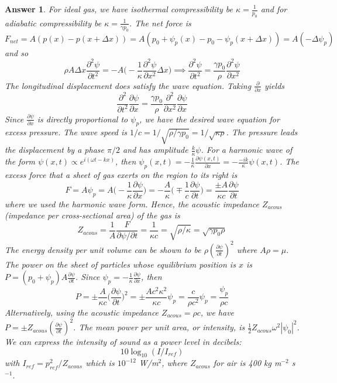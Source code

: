 \documentclass[a4paper]{article}
\newtheorem{ans}{Answer}[subsection]
\theoremstyle{new}
\begin{document}
\begin{ans}
For ideal gas, we have isothermal compressibility be $\kappa=\frac{1}{p_0}$ and for adiabatic compressibility be $\kappa=\frac{1}{\gamma p_0}$. The net force is $F_{net}=A(p(x)-p(x+\Delta x))=A(p_0+\psi_p(x)-p_0-\psi_p(x+\Delta x))=A(-\Delta\psi_p)$ and so
$$\rho A\Delta x\frac{\partial^2\psi}{\partial t^2}=-A\bigg(-\frac{1}{\kappa}\frac{\partial^2\psi}{\partial x^2}\Delta x\bigg)\implies\frac{\partial^2\psi}{\partial t^2}=\frac{\gamma p_0}{\rho}\frac{\partial^2\psi}{\partial x^2}$$
The longitudinal displacement does satisfy the wave equation. Taking $\frac{\partial}{\partial x}$ yields $$\frac{\partial^2}{\partial t^2}\frac{\partial\psi}{\partial x}=\frac{\gamma p_0}{\rho}\frac{\partial^2}{\partial x^2}\frac{\partial\psi}{\partial x}$$
Since $\frac{\partial\psi}{\partial x}$ is directly proportional to $\psi_p$, we have the desired wave equation for excess pressure. The wave speed is $1/c=1/\sqrt{\rho/\gamma p_0}=1/\sqrt{\kappa\rho}$. The pressure leads the displacement by a phase $\pi/2$ and has amplitude $\frac{k}{\kappa}\psi$. For a harmonic wave of the form $\psi(x,t)\propto e^{i(\omega t-kx)}$, then $\psi_p(x,t)=-\frac{1}{\kappa}\frac{\partial\psi(x,t)}{\partial x}=-\frac{-ik}{\kappa}\psi(x,t)$. The excess force that a sheet of gas exerts on the region to its right is $$F=A\psi_p=A\bigg(-\frac{1}{\kappa}\frac{\partial\psi}{\partial x}\bigg)=-\frac{A}{\kappa}\bigg(\mp\frac{1}{c}\frac{\partial\psi}{\partial t}\bigg)=\frac{\pm A}{\kappa c}\frac{\partial\psi}{\partial t}$$
where we used the harmonic wave form. Hence, the acoustic impedance  $Z_{acous}$ (impedance per cross-sectional area) of the gas is $$Z_{acous}=\frac{1}{A}\frac{F}{\partial\psi/\partial t}=\frac{1}{\kappa c}=\sqrt{\rho/\kappa}=\sqrt{\gamma p_0\rho}$$
The energy density per unit volume can be shown to be $\rho(\frac{\partial\psi}{\partial t})^2$ where $A\rho=\mu$. The power on the sheet of particles whose equilibrium position is $x$ is $P=(p_0+\psi_p)A\frac{\partial\psi}{\partial t}$. Since $\psi_p=-\frac{1}{\kappa}\frac{\partial\psi}{\partial x}$, then $$P=\pm\frac{A}{\kappa c}\bigg(\frac{\partial\psi}{\partial t}\bigg)^2=\pm\frac{Ac^2\kappa^2}{\kappa c}\psi_p=\frac{c}{\rho c^2}\psi_p=\frac{\psi_p}{\rho c}$$ 
Alternatively, using the acoustic impedance $Z_{acous}=\rho c$, we have $P=\pm Z_{acous}(\frac{\partial\psi}{\partial t})^2$. The mean power per unit area, or intensity, is  $\frac{1}{2}Z_{acous}\omega^2|\psi_0|^2$. We can express the intensity of sound as a power level in decibels:
$$10\log_{10}(I/I_{ref})$$
with $I_{ref}=p_{ref}^2/Z_{acous}$ which is $10^{-12}$ W/m$^2$, where $Z_{acous}$ for air is 400 kg m$^{-2}$ s$^{-1}$.

\end{ans}
\end{document}
